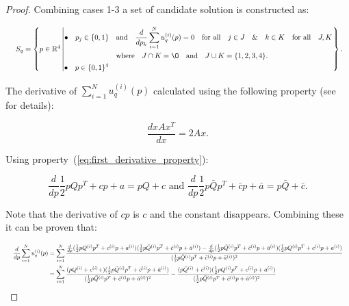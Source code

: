 \begin{proof}
Combining cases 1-3 a set of candidate solution is constructed as:

\begin{equation*}
    \resizebox{\linewidth}{!}{ $
    S_q =
    \left\{p \in \mathbb{R} ^ 4 \left|
        \begin{aligned}
            \bullet\quad p_j \in \{0, 1\} & \quad \text{and} \quad \frac{d}{dp_k} 
            \sum\limits_{i=1} ^ N  u_q^{(i)}(p) = 0
            \quad \text{for all} \quad j \in J \quad \&  \quad k \in K  \quad \text{for all} \quad J, K \\
            & \quad \text{where} \quad J \cap K = \O \quad
            \text{and} \quad J \cup K = \{1, 2, 3, 4\}.\\
            \bullet\quad  p \in \{0, 1\} ^ 4
        \end{aligned}\right.
    \right\}.
    $}
\end{equation*}

The derivative of \(\sum\limits_{i=1} ^ N  u_q^{(i)}(p)\) calculated using
the following property (see~\cite{Abadir2005} for details):

\begin{equation}\label{eq:first_derivative_property}
\frac{d x A x^T}{dx} =  2Ax.
\end{equation}

Using property~(\ref{eq:first_derivative_property}):

\begin{equation}\label{eq:quadratics_derivatives}
\frac{d}{dp} \frac{1}{2}pQp^T + cp + a = pQ + c \text{ and } \frac{d}{dp} \frac{1}{2}p\bar{Q}p^T + \bar{c}p + \bar{a} = p\bar{Q} + \bar{c}.
\end{equation}

Note that the derivative of \(cp\) is \(c\) and the constant disappears.
Combining these it can be proven that:

\begin{equation*}
\resizebox{\textwidth}{!}{$ \begin{split}
\frac{d}{dp} \sum\limits_{i=1} ^ N  u_q^{(i)}(p) & = \sum\limits_{i=1} ^ N \frac{\frac{d}{dp}(\frac{1}{2}pQ^{(i)}p^T + c^{(i)}p + a^{(i)} )(\frac{1}{2}p\bar{Q}^{(i)}p^T + \bar{c}^{(i)}p + \bar{a}^{(i)}) -
\frac{d}{dp}(\frac{1}{2}p\bar{Q}^{(i)}p^T + \bar{c}^{(i)}p + \bar{a}^{(i)})(\frac{1}{2}pQ^{(i)}p^T + c^{(i)}p + a^{(i)})}{(\frac{1}{2}p\bar{Q}^{(i)}p^T + \bar{c}^{(i)}p + \bar{a}^{(i)})^2} \\
& = \sum\limits_{i=1} ^ N \frac{(pQ^{(i)} + c^{(i)} +)(\frac{1}{2}p\bar{Q}^{(i)}p^T + \bar{c}^{(i)}p + \bar{a}^{(i)})}{(\frac{1}{2}p\bar{Q}^{(i)}p^T + \bar{c}^{(i)}p + \bar{a}^{(i)})^2} -
 \frac{(p\bar{Q}^{(i)}+ \bar{c}^{(i)})(\frac{1}{2}pQ^{(i)}p^T + c^{(i)}p + a^{(i)})}{(\frac{1}{2}p\bar{Q}^{(i)}p^T + \bar{c}^{(i)}p + \bar{a}^{(i)})^2}
\end{split}$}
\end{equation*}


\end{proof}
